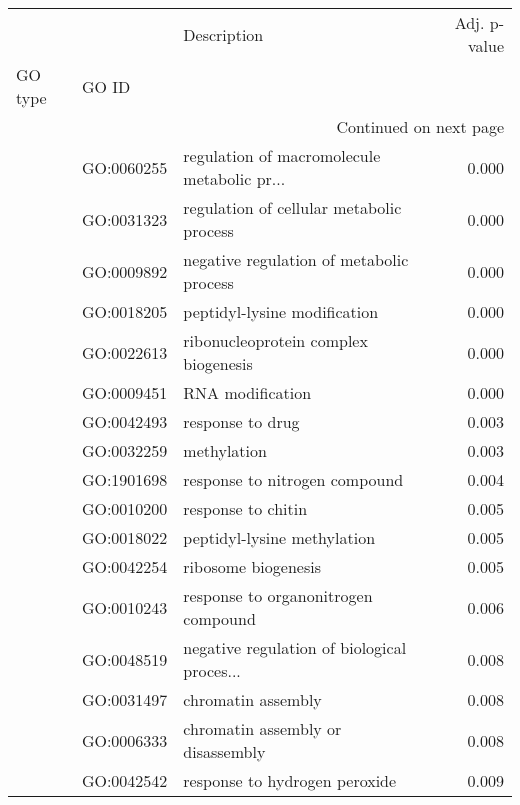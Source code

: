 \begin{longtable}{lllr}
\toprule
   &            &                                  Description &  Adj. p-value \\
GO type & GO ID &                                              &               \\
\midrule
\endhead
\midrule
\multicolumn{4}{r}{{Continued on next page}} \\
\midrule
\endfoot

\bottomrule
\endlastfoot
\multirow{42}{*}{BP} & GO:0060255 &  regulation of macromolecule metabolic pr... &         0.000 \\
   & GO:0031323 &     regulation of cellular metabolic process &         0.000 \\
   & GO:0009892 &     negative regulation of metabolic process &         0.000 \\
   & GO:0018205 &                 peptidyl-lysine modification &         0.000 \\
   & GO:0022613 &         ribonucleoprotein complex biogenesis &         0.000 \\
   & GO:0009451 &                             RNA modification &         0.000 \\
   & GO:0042493 &                             response to drug &         0.003 \\
   & GO:0032259 &                                  methylation &         0.003 \\
   & GO:1901698 &                response to nitrogen compound &         0.004 \\
   & GO:0010200 &                           response to chitin &         0.005 \\
   & GO:0018022 &                  peptidyl-lysine methylation &         0.005 \\
   & GO:0042254 &                          ribosome biogenesis &         0.005 \\
   & GO:0010243 &          response to organonitrogen compound &         0.006 \\
   & GO:0048519 &  negative regulation of biological proces... &         0.008 \\
   & GO:0031497 &                           chromatin assembly &         0.008 \\
   & GO:0006333 &            chromatin assembly or disassembly &         0.008 \\
   & GO:0042542 &                response to hydrogen peroxide &         0.009 \\

\end{longtable}
